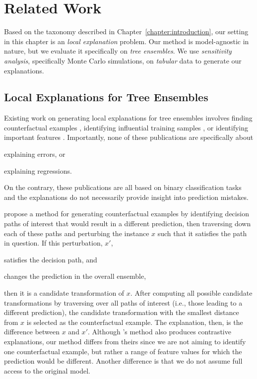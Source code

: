 
\section{Related Work}
\label{section:2}
Based on the taxonomy described in Chapter~\ref{chapter:introduction}, our setting in this chapter is an \emph{local explanation} problem. Our method is model-agnostic in nature, but we evaluate it specifically on \emph{tree ensembles}. 
We use \emph{sensitivity analysis}, specifically Monte Carlo simulations, on \emph{tabular} data to generate our explanations. 

\subsection{Local Explanations for Tree Ensembles}

Existing work on generating local explanations for tree ensembles involves finding counterfactual examples \citep{tolomei_interpretable_2017}, identifying influential training samples \citep{sharchilev-2018-finding}, or identifying important features \citep{lundberg_explainable_2019}. 
Importantly, none of these publications are specifically about 
\begin{inparaenum}[(i)]
	\item explaining errors, or
	\item explaining regressions. 
\end{inparaenum} 
On the contrary, these publications are all based on binary classification tasks and the explanations do not necessarily provide insight into prediction mistakes. 

\citet{tolomei_interpretable_2017} propose a method for generating counterfactual examples by identifying decision paths of interest that would result in a different prediction, then traversing down each of these paths and perturbing the instance $x$ such that it satisfies the path in question. 
If this perturbation, $x'$,  
\begin{inparaenum}[(i)]
	\item satisfies the decision path, and
	\item changes the prediction in the overall ensemble, 
\end{inparaenum}
then it is a candidate transformation of $x$. 
After computing all possible candidate transformations by traversing over all paths of interest (i.e., those leading to a different prediction), the candidate transformation with the smallest distance from $x$ is selected as the counterfactual example. 
The explanation, then, is the difference between $x$ and $x'$. 
Although \citet{tolomei_interpretable_2017}'s method also produces contrastive explanations, our method differs from theirs since we are not aiming to identify one counterfactual example, but rather a range of feature values for which the prediction would be different. 
Another difference is that we do not assume full access to the original model. 

